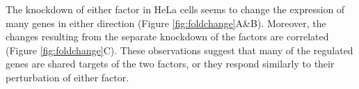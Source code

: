 \documentclass[9pt,a4paper,]{extarticle}
\newenvironment{Shaded}{\begin{snugshade}}{\end{snugshade}}
\newcommand{\CommentTok}[1]{\textcolor[rgb]{0.56,0.35,0.01}{\textit{#1}}}
\newcommand{\DataTypeTok}[1]{\textcolor[rgb]{0.13,0.29,0.53}{#1}}
\newcommand{\DecValTok}[1]{\textcolor[rgb]{0.00,0.00,0.81}{#1}}
\newcommand{\KeywordTok}[1]{\textcolor[rgb]{0.13,0.29,0.53}{\textbf{#1}}}
\newcommand{\NormalTok}[1]{#1}
\newcommand{\OperatorTok}[1]{\textcolor[rgb]{0.81,0.36,0.00}{\textbf{#1}}}
\newcommand{\OtherTok}[1]{\textcolor[rgb]{0.56,0.35,0.01}{#1}}
\newcommand{\StringTok}[1]{\textcolor[rgb]{0.31,0.60,0.02}{#1}}
\begin{document}
\begin{Shaded}
\end{Shaded}

The knockdown of either factor in HeLa cells seems to change the expression of many genes in either direction (Figure \ref{fig:foldchange}A\&B). Moreover, the changes resulting from the separate knockdown of the factors are correlated (Figure \ref{fig:foldchange}C). These observations suggest that many of the regulated genes are shared targets of the two factors, or they respond similarly to their perturbation of either factor.
\end{document}

